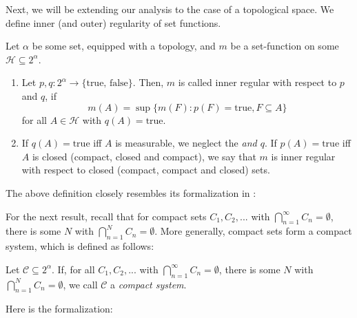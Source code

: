\documentclass[lean]{AFM}
\begin{document}
\noindent
Next, we will be extending our analysis to the case of a topological
space. We define inner (and outer) regularity of set functions.

\begin{definition} \label{def:innerreg}
  Let $\alpha$ be some set, equipped with a topology, and $m$ be a
  set-function on some $\mathcal H \subseteq 2^\alpha$.
  \begin{enumerate}
  \item Let $p, q : 2^\alpha \to \{\text{true, false}\}$. Then, $m$ is
    called inner regular with respect to $p$ and $q$, if
    $$ m(A) = \sup\{m(F) : p(F) = \text{true}, F \subseteq A\}$$ for
    all $A \in \mathcal H$ with $q(A) = \text{true}$.
  \item If $q(A) = \text{true}$ iff $A$ is measurable, we neglect the
    {\em and $q$}. If $p(A) = \text{true}$ iff $A$ is closed (compact,
    closed and compact), we say that $m$ is inner regular with respect
    to closed (compact, compact and closed) sets.
  \end{enumerate}
\end{definition}

\noindent
The above definition closely resembles its formalization in
:


For the next result, recall that for compact sets $C_1, C_2,...$ with
$\bigcap_{n=1}^\infty C_n = \emptyset$, there is some $N$ with
$\bigcap_{n=1}^N C_n = \emptyset$. More generally, compact sets form a
compact system, which is defined as follows:

\begin{definition}
  Let $\mathcal C \subseteq 2^\alpha$. If, for all $C_1, C_2,...$ with
  $\bigcap_{n=1}^\infty C_n = \emptyset$, there is some $N$ with
  $\bigcap_{n=1}^N C_n = \emptyset$, we call $\mathcal C$ a {\em
    compact system}.
\end{definition}

\noindent
Here is the formalization:

\end{document}
